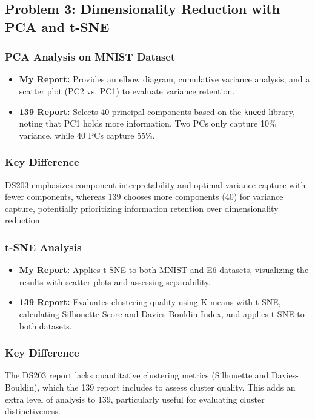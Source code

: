 \subsection*{Problem 3: Dimensionality Reduction with PCA and t-SNE}

\subsubsection*{PCA Analysis on MNIST Dataset}
\begin{itemize}
    \item \textbf{My Report:} Provides an elbow diagram, cumulative variance analysis, and a scatter plot (PC2 vs. PC1) to evaluate variance retention.
    \item \textbf{139 Report:} Selects 40 principal components based on the \texttt{kneed} library, noting that PC1 holds more information. Two PCs only capture 10\% variance, while 40 PCs capture 55\%.
\end{itemize}

\subsubsection*{Key Difference}
DS203 emphasizes component interpretability and optimal variance capture with fewer components, whereas 139 chooses more components (40) for variance capture, potentially prioritizing information retention over dimensionality reduction.

\subsubsection*{t-SNE Analysis}
\begin{itemize}
    \item \textbf{My Report:} Applies t-SNE to both MNIST and E6 datasets, visualizing the results with scatter plots and assessing separability.
    \item \textbf{139 Report:} Evaluates clustering quality using K-means with t-SNE, calculating Silhouette Score and Davies-Bouldin Index, and applies t-SNE to both datasets.
\end{itemize}

\subsubsection*{Key Difference}
The DS203 report lacks quantitative clustering metrics (Silhouette and Davies-Bouldin), which the 139 report includes to assess cluster quality. This adds an extra level of analysis to 139, particularly useful for evaluating cluster distinctiveness.

